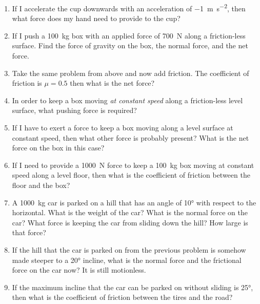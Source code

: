 \begin{enumerate}
\item If I accelerate the cup downwards with an acceleration of \SI{-1}{\meter \per \second^2}, then what force does my hand need to provide to the cup?\\


\item If I push a \SI{100}{\kilogram} box with an applied force of \SI{700}{\newton} along a friction-less surface. Find the force of gravity on the box, the normal force, and the net force.\hugeskip

\item Take the same problem from above and now add friction. The coefficient of friction is $\mu=0.5$ then what is the net force?\hugeskip

\item In order to keep a box moving \emph{at constant speed} along a friction-less level surface, what pushing force is required?\\
\item If I have to exert a force to keep a box moving along a level surface at constant speed, then what other force is probably present? What is the net force on the box in this case?\\
\item If I need to provide a \SI{1000}{\newton} force to keep a \SI{100}{\kilogram} box moving at constant speed along a level floor, then what is the coefficient of friction between the floor and the box?\hugeskip

\item A \SI{1000}{\kilogram} car is parked on a hill that has an angle of \ang{10} with respect to the horizontal. What is the weight of the car? What is the normal force on the car? What force is keeping the car from sliding down the hill? How large is that force?\giantskip

\item If the hill that the car is parked on from the previous problem is somehow made steeper to a \ang{20} incline, what is the normal force and the frictional force on the car now? It is still motionless.\giantskip

\item If the maximum incline that the car can be parked on without sliding is \ang{25}, then what is the coefficient of friction between the tires and the road?\giantskip






\end{enumerate}
